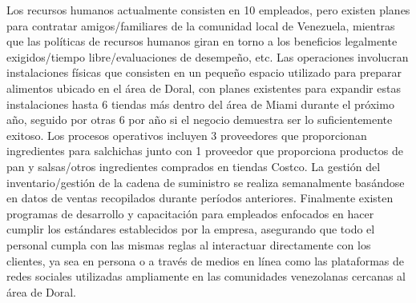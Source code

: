 Los recursos humanos actualmente consisten en 10 empleados, pero existen planes para contratar amigos/familiares de la comunidad local de Venezuela, mientras que las políticas de recursos humanos giran en torno a los beneficios legalmente exigidos/tiempo libre/evaluaciones de desempeño, etc. Las operaciones involucran instalaciones físicas que consisten en un pequeño espacio utilizado para preparar alimentos ubicado en el área de Doral, con planes existentes para expandir estas instalaciones hasta 6 tiendas más dentro del área de Miami durante el próximo año, seguido por otras 6 por año si el negocio demuestra ser lo suficientemente exitoso. Los procesos operativos incluyen 3 proveedores que proporcionan ingredientes para salchichas junto con 1 proveedor que proporciona productos de pan y salsas/otros ingredientes comprados en tiendas Costco. La gestión del inventario/gestión de la cadena de suministro se realiza semanalmente basándose en datos de ventas recopilados durante períodos anteriores.
Finalmente existen programas de desarrollo y capacitación para empleados enfocados en hacer cumplir los estándares establecidos por la empresa, asegurando que todo el personal cumpla con las mismas reglas al interactuar directamente con los clientes, ya sea en persona o a través de medios en línea como las plataformas de redes sociales utilizadas ampliamente en las comunidades venezolanas cercanas al área de Doral.
